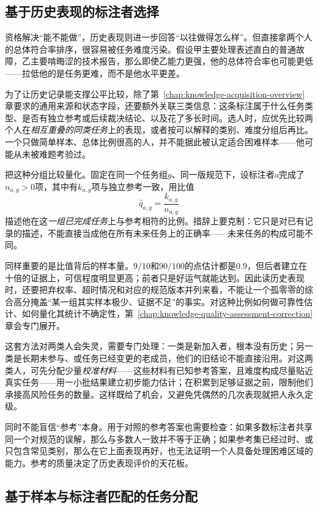 \subsection{基于历史表现的标注者选择}
\label{sec:knowledge-acquisition-human-history-selection}

资格解决“能不能做”，历史表现则进一步回答“以往做得怎么样”。但直接拿两个人的总体符合率排序，很容易被任务难度污染。假设甲主要处理表述直白的普通故障，乙主要啃晦涩的技术报告，那么即使乙能力更强，他的总体符合率也可能更低——拉低他的是任务更难，而不是他水平更差。

为了让历史记录能支撑公平比较，除了第~\ref{chap:knowledge-acquisition-overview}章要求的通用来源和状态字段，还要额外关联三类信息：这条标注属于什么任务类型、是否有独立参考或后续裁决结论、以及花了多长时间。选人时，应优先比较两个人在\emph{相互重叠的同类任务}上的表现，或者按可以解释的类别、难度分组后再比。一个只做简单样本、总体比例很高的人，并不能据此被认定适合困难样本——他可能从未被难题考验过。

把这种分组比较量化。固定在同一个任务组$g$、同一版规范下，设标注者$a$完成了$n_{a,g}>0$项，其中有$k_{a,g}$项与独立参考一致，用比值
\[
  \widehat q_{a,g}=\frac{k_{a,g}}{n_{a,g}}
\]
描述他在这\emph{一组已完成任务}上与参考相符的比例。措辞上要克制：它只是对已有记录的描述，不能直接当成他在所有未来任务上的正确率——未来任务的构成可能不同。

同样重要的是比值背后的样本量。$9/10$和$90/100$的点估计都是$0.9$，但后者建立在十倍的证据上，可信程度明显更高；前者只是好运气就能达到。因此读历史表现时，还要把弃权率、超时情况和对应的规范版本并列来看，不能让一个孤零零的综合高分掩盖“某一组其实样本极少、证据不足”的事实。对这种比例如何做可靠性估计、如何量化其统计不确定性，第~\ref{chap:knowledge-quality-assessment-correction}章会专门展开。

这套方法对两类人会失灵，需要专门处理：一类是新加入者，根本没有历史；另一类是长期未参与、或任务已经变更的老成员，他们的旧结论不能直接沿用。对这两类人，可先分配少量\emph{校准材料}——这些材料有已知参考答案，且难度构成尽量贴近真实任务——用一小批结果建立初步能力估计；在积累到足够证据之前，限制他们承接高风险任务的数量。这样既给了机会，又避免凭偶然的几次表现就把人永久定级。

同时不能盲信“参考”本身。用于对照的参考答案也需要检查：如果多数标注者共享同一个对规范的误解，那么与多数人一致并不等于正确；如果参考集已经过时、或只包含常见类别，那么在它上面表现再好，也无法证明一个人具备处理困难区域的能力。参考的质量决定了历史表现评价的天花板。

\subsection{基于样本与标注者匹配的任务分配}
\label{sec:knowledge-acquisition-human-matching}

